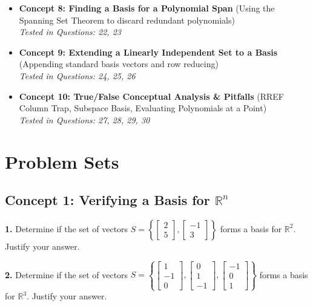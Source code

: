 \documentclass[11pt]{article}
\begin{document}
\begin{itemize}
    \item \textbf{Concept 8: Finding a Basis for a Polynomial Span} (Using the Spanning Set Theorem to discard redundant polynomials) \\
    \textit{Tested in Questions: 22, 23}
    
    \item \textbf{Concept 9: Extending a Linearly Independent Set to a Basis} (Appending standard basis vectors and row reducing) \\
    \textit{Tested in Questions: 24, 25, 26}
    
    \item \textbf{Concept 10: True/False Conceptual Analysis \& Pitfalls} (RREF Column Trap, Subspace Basis, Evaluating Polynomials at a Point) \\
    \textit{Tested in Questions: 27, 28, 29, 30}
\end{itemize}

\newpage

\section{Problem Sets}

\subsection*{Concept 1: Verifying a Basis for $\mathbb{R}^n$}
\textbf{1.} Determine if the set of vectors $S = \left\{ \begin{bmatrix} 2 \\ 5 \end{bmatrix}, \begin{bmatrix} -1 \\ 3 \end{bmatrix} \right\}$ forms a basis for $\mathbb{R}^2$. Justify your answer.

\vspace{0.5cm}
\textbf{2.} Determine if the set of vectors $S = \left\{ \begin{bmatrix} 1 \\ -1 \\ 0 \end{bmatrix}, \begin{bmatrix} 0 \\ 1 \\ -1 \end{bmatrix}, \begin{bmatrix} -1 \\ 0 \\ 1 \end{bmatrix} \right\}$ forms a basis for $\mathbb{R}^3$. Justify your answer.
\end{document}
